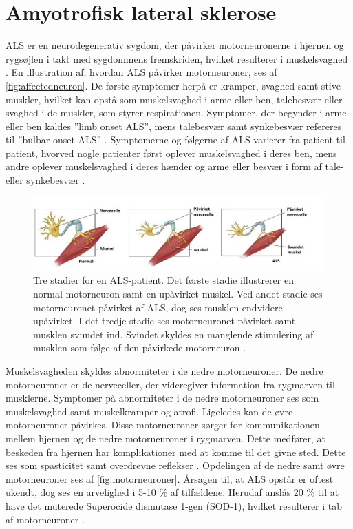 \section{Amyotrofisk lateral sklerose}
ALS er en neurodegenerativ sygdom, der påvirker motorneuronerne i hjernen og rygsøjlen i takt med sygdommens fremskriden, hvilket resulterer i muskelsvaghed \citep{henschke2012}. En illustration af, hvordan ALS påvirker motorneuroner, ses af \autoref{fig:affectedneuron}. De første symptomer herpå er kramper, svaghed samt stive muskler, hvilket kan opstå som muskelsvaghed i arme eller ben, talebesvær eller svaghed i de muskler, som styrer respirationen. Symptomer, der begynder i arme eller ben kaldes ”limb onset ALS”, mens talebesvær samt synkebesvær refereres til ”bulbar onset ALS” \citep{nationalinstitute2016}. 
Symptomerne og følgerne af ALS varierer fra patient til patient, hvorved nogle patienter først oplever muskelsvaghed i deres ben, mens andre oplever muskelsvaghed i deres hænder og arme eller besvær i form af tale- eller synkebesvær \citep{miller2005, nationalinstitute2016}.

\begin{figure}[H]
\centering
\includegraphics[width=1\textwidth]{figures/affectedneuron}
\caption{Tre stadier for en ALS-patient. Det første stadie illustrerer en normal motorneuron samt en upåvirket muskel. Ved andet stadie ses motorneuronet påvirket af ALS, dog ses musklen endvidere upåvirket. I det tredje stadie ses motorneuronet påvirket samt musklen svundet ind. Svindet skyldes en manglende stimulering af musklen som følge af den påvirkede motorneuron \citep{drake2015}.}
\label{fig:affectedneuron}
\end{figure}
 
Muskelsvagheden skyldes abnormiteter i de nedre motorneuroner. De nedre motorneuroner er de nerveceller, der videregiver information fra rygmarven til musklerne. Symptomer på abnormiteter i de nedre motorneuroner ses som muskelsvaghed samt muskelkramper og atrofi.
Ligeledes kan de øvre motorneuroner påvirkes. Disse motorneuroner sørger for kommunikationen mellem hjernen og de nedre motorneuroner i rygmarven. Dette medfører, at beskeden fra hjernen har komplikationer med at komme til det givne sted. Dette ses som spasticitet samt overdrevne reflekser \citep{nationalinstitute2016}. Opdelingen af de nedre samt øvre motorneuroner ses af \autoref{fig:motorneuroner}.
Årsagen til, at ALS opstår er oftest ukendt, dog ses en arvelighed i 5-10 \% af tilfældene. Herudaf anslås 20 \% til at have det muterede Superocide dismutase 1-gen (SOD-1), hvilket resulterer i tab af motorneuroner \citep{miller2005}.

